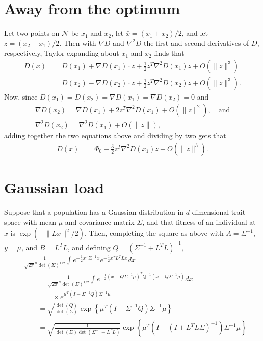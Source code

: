 \documentclass{article}
\newcommand{\grad}{\nabla}
\newcommand{\1}{\mathbbm{1}}
\newcommand{\allS}{\mathcal{N}}
\newcommand{\optph}{\Phi_0}
\begin{document}
\section{Away from the optimum}
\label{apx:away_from_opt}

Let two points on $\allS$ be $x_1$ and $x_2$, let $\bar x = (x_1+x_2)/2$, and let $z=(x_2 - x_1)/2$.
Then with $\grad D$ and $\grad^2 D$ the first and second derivatives of $D$, respectively,
Taylor expanding about $x_1$ and $x_2$ finds that
\begin{align*}
    D(\bar x) 
    &= D(x_1) + \grad D(x_1) \cdot z + \frac{1}{2} z^T \grad^2  D(x_1) z + O(\|z\|^3) \\
    &=  D(x_2) - \grad D(x_2) \cdot z + \frac{1}{2} z^T \grad^2  D(x_2) z + O(\|z\|^3) .
\end{align*}
Now, since $ D(x_1) =  D(x_2) = \grad D(x_1) = \grad D(x_2) = 0$ and
\begin{align*}
    \grad D(x_2) = \grad D(x_1) + 2 z^T \grad^2  D(x_1) + O(\|z\|^2), \quad \text{and} \\
    \grad^2 D(x_2) = \grad^2 D(x_1) + O(\|z\|), 
\end{align*}
adding together the two equations above and dividing by two gets that
\begin{align*}
     D(\bar x) 
    &= \optph - \frac{3}{2} z^T \grad^2  D(x_1) z + O(\|z\|^3) .
\end{align*}


\section{Gaussian load}
\label{apx:gauss_load}

Suppose that a population has a Gaussian distribution in $d$-dimensional trait space
with mean $\mu$ and covariance matrix $\Sigma$,
and that fitness of an individual at $x$ is $\exp(-\|Lx\|^2/2)$.
Then, completing the square as above with $A=\Sigma^{-1}$, $y=\mu$, and $B=L^T L$,
and defining $Q = (\Sigma^{-1} + L^T L)^{-1}$,
\begin{align*}
    &
    \frac{1}{\sqrt{2 \pi}^n \det(\Sigma)^{1/2}} 
        \int e^{-\frac{1}{2} x^T \Sigma^{-1} x} e^{-\frac{1}{2} x^T L^T L x} dx \\
    &\qquad =
    \frac{1}{\sqrt{2 \pi}^n \det(\Sigma)^{1/2}} 
        \int e^{-\frac{1}{2}(x-Q \Sigma^{-1} \mu)^T Q^{-1} (x-Q \Sigma^{-1} \mu)} dx 
        \\ &\qquad \qquad {}
        \times e^{\mu^T \left( I - \Sigma^{-1} Q \right) \Sigma^{-1} \mu} \\
    &\qquad =
    \sqrt{\frac{\det(Q)}{\det(\Sigma)}}
        \exp\left\{\mu^T \left( I - \Sigma^{-1} Q \right) \Sigma^{-1} \mu\right\} \\
    &\qquad =
    \sqrt{\frac{1}{\det(\Sigma)\det(\Sigma^{-1}+L^TL)}}
        \exp\left\{\mu^T \left( I - (I + L^T L \Sigma)^{-1} \right) \Sigma^{-1} \mu\right\} \\
\end{align*}
\end{document}

